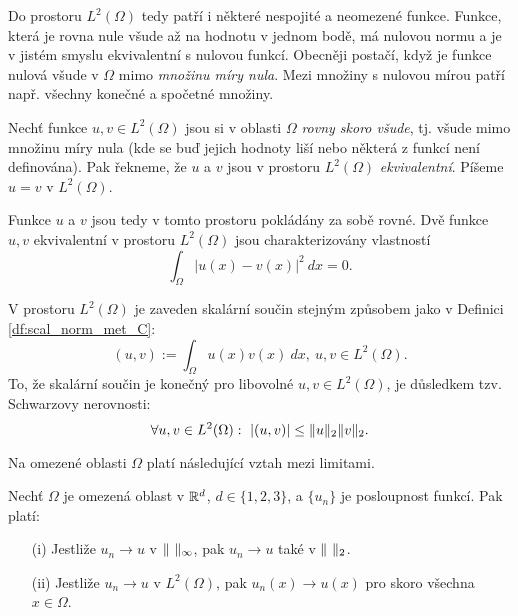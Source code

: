 Do prostoru $L^2(\Omega)$ tedy patří i některé nespojité a neomezené funkce.
Funkce, která je rovna nule všude až na hodnotu v jednom bodě, má nulovou normu a je v jistém smyslu ekvivalentní s nulovou funkcí.
Obecněji postačí, když je funkce nulová všude v $\Omega$ mimo \emph{množinu míry nula}.
Mezi množiny s nulovou mírou patří např. všechny konečné a spočetné množiny.

\begin{df}
Nechť funkce $u,v\in L^2(\Omega)$ jsou si v oblasti $\Omega$ \emph{rovny skoro všude}, tj. všude mimo množinu míry nula (kde se buď jejich hodnoty liší nebo některá z funkcí není definována).
Pak řekneme, že $u$ a $v$ jsou v prostoru $L^2(\Omega)$ \emph{ekvivalentní}.
Píšeme $u=v$ v $L^2(\Omega)$.
\end{df}
Funkce $u$ a $v$ jsou tedy v tomto prostoru pokládány za sobě rovné.
Dvě funkce $u,v$ ekvivalentní v prostoru $L^2(\Omega)$ jsou charakterizovány vlastností
\[ \int_\Omega|u(x)-v(x)|^2~dx = 0. \]

V prostoru $L^2(\Omega)$ je zaveden skalární součin stejným způsobem jako v Definici \ref{df:scal_norm_met_C}:
\[ (u,v) := \int_\Omega u(x)v(x)~dx,~u,v\in L^2(\Omega). \]
To, že skalární součin je konečný pro libovolné $u,v\in L^2(\Omega)$, je důsledkem tzv. Schwarzovy nerovnosti:
\[ \forall u,v\in L^2(\Omega):~|(u,v)| \le \|u\|_{2} \|v\|_{2}. \]

Na omezené oblasti $\Omega$ platí následující vztah mezi limitami.
\begin{veta}
Nechť $\Omega$ je omezená oblast v $\mathbb R^d$, $d\in\{1,2,3\}$, a $\{u_n\}$ je posloupnost funkcí.
Pak platí:
\begin{itemize}
\item[(i)] Jestliže $u_n\to u$ v $\|\ \|_\infty$, pak $u_n\to u$ také v $\|\ \|_2$.
\item[(ii)] Jestliže $u_n\to u$ v $L^2(\Omega)$, pak $u_n(x)\to u(x)$ pro skoro všechna $x\in\Omega$.
\end{itemize}
\end{veta}






